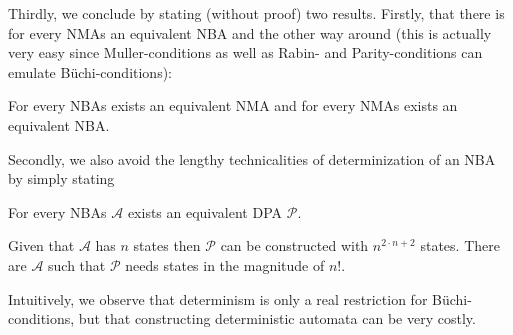 Thirdly, we conclude by stating (without proof) two results. Firstly, that
there is for every \acp{NMA} an equivalent \ac{NBA} and the other way around
(this is actually very easy since Muller-conditions as well as Rabin- and
Parity-conditions can emulate Büchi-conditions):
\begin{theorem}
  \cite[Theorem 1.10]{AutoLogInfGames}
  For every \acp{NBA} exists an equivalent \ac{NMA} and for every \acp{NMA}
  exists an equivalent \ac{NBA}.
\end{theorem}
Secondly, we also avoid the lengthy technicalities of determinization of an
\ac{NBA} by simply stating
\begin{theorem}
  \cite[Theorem 3.6]{AutoLogInfGames}
  \cite[Section 3.2]{NonDetBuechiToDetParity}
  \cite[Theorem 6]{OptBoundsAutoTrans}
  For every \acp{NBA} $\mathcal{A}$ exists an equivalent \ac{DPA}
  $\mathcal{P}$.

  Given that $\mathcal{A}$ has $n$ states then $\mathcal{P}$ can be
  constructed with $n^{2\cdot n + 2}$ states. There are $\mathcal{A}$
  such that $\mathcal{P}$ needs states in the magnitude of $n!$.
\end{theorem}
Intuitively, we observe that determinism is only a real restriction for
Büchi-conditions, but that constructing deterministic automata can be very
costly.

